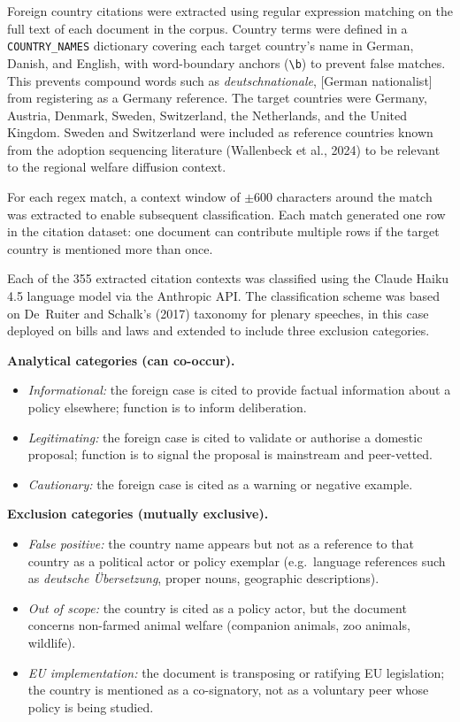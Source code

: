 \documentclass[twocolumn, 10pt, a4paper]{article}
\begin{document}
Foreign country citations were extracted using regular expression matching on the
full text of each document in the corpus. Country terms were defined in a
\texttt{COUNTRY\_NAMES} dictionary covering each target country's name in German,
Danish, and English, with word-boundary anchors (\texttt{\textbackslash b}) to
prevent false matches. This prevents compound words such as
\textit{deutschnationale}, [German nationalist] from registering as a Germany
reference. The target countries were Germany, Austria, Denmark, Sweden, Switzerland,
the Netherlands, and the United Kingdom. Sweden and Switzerland were included as
reference countries known from the adoption sequencing literature (Wallenbeck et al.,
2024) to be relevant to the regional welfare diffusion context.

For each regex match, a context window of $\pm600$ characters around the match was
extracted to enable subsequent classification. Each match generated one row in the
citation dataset: one document can contribute multiple rows if the target country is
mentioned more than once.

Each of the 355 extracted citation contexts was classified using the Claude Haiku 4.5
language model via the Anthropic API. The classification scheme was based on De~Ruiter
and Schalk's (2017) taxonomy for plenary speeches, in this case deployed on bills and
laws and extended to include three exclusion categories.

\noindent\textbf{Analytical categories (can co-occur).}
\begin{itemize}
  \item \textit{Informational:} the foreign case is cited to provide factual
        information about a policy elsewhere; function is to inform deliberation.
  \item \textit{Legitimating:} the foreign case is cited to validate or authorise a
        domestic proposal; function is to signal the proposal is mainstream and
        peer-vetted.
  \item \textit{Cautionary:} the foreign case is cited as a warning or negative
        example.
\end{itemize}

\noindent\textbf{Exclusion categories (mutually exclusive).}
\begin{itemize}
  \item \textit{False positive:} the country name appears but not as a reference to
        that country as a political actor or policy exemplar (e.g.\ language
        references such as \textit{deutsche \"Ubersetzung}, proper nouns, geographic
        descriptions).
  \item \textit{Out of scope:} the country is cited as a policy actor, but the
        document concerns non-farmed animal welfare (companion animals, zoo animals,
        wildlife).
  \item \textit{EU implementation:} the document is transposing or ratifying EU
        legislation; the country is mentioned as a co-signatory, not as a voluntary
        peer whose policy is being studied.
\end{itemize}
\end{document}
